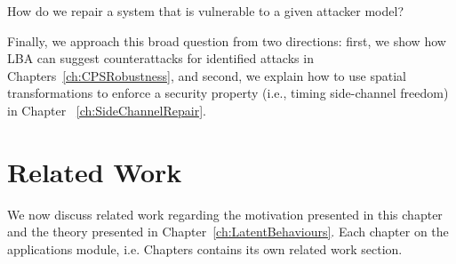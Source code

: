 \begin{question}
\label{que:Repair}
How do we repair a system that is vulnerable to a given attacker model?
\end{question}
Finally, we approach this broad question from two directions: first, we show how LBA can suggest counterattacks for identified attacks in Chapters~\ref{ch:CPSRobustness}, and second, we explain how to use spatial transformations to enforce a security property (i.e., timing side-channel freedom) in Chapter ~\ref{ch:SideChannelRepair}. 

\section{Related Work}
We now discuss related work regarding the motivation presented in this chapter and the theory presented in Chapter~\ref{ch:LatentBehaviours}. Each chapter on the applications module, i.e. Chapters contains its own related work section.












